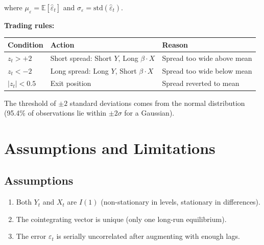 \documentclass[12pt, a4paper]{article}
\begin{document}
where $\mu_\varepsilon = \mathbb{E}[\hat\varepsilon_t]$ and $\sigma_\varepsilon = \text{std}(\hat\varepsilon_t)$.

\textbf{Trading rules:}
\begin{center}
\begin{tabular}{@{}lll@{}}
\toprule
\textbf{Condition} & \textbf{Action} & \textbf{Reason} \\
\midrule
$z_t > +2$      & Short spread: Short $Y$, Long $\beta \cdot X$  & Spread too wide above mean \\
$z_t < -2$      & Long spread:  Long $Y$, Short $\beta \cdot X$  & Spread too wide below mean \\
$|z_t| < 0.5$   & Exit position                                    & Spread reverted to mean \\
\bottomrule
\end{tabular}
\end{center}

The threshold of $\pm 2$ standard deviations comes from the normal distribution 
(95.4\% of observations lie within $\pm 2\sigma$ for a Gaussian).

\section{Assumptions and Limitations}

\subsection{Assumptions}
\begin{enumerate}
    \item Both $Y_t$ and $X_t$ are $I(1)$ (non-stationary in levels, stationary in differences).
    \item The cointegrating vector is unique (only one long-run equilibrium).
    \item The error $\varepsilon_t$ is serially uncorrelated after augmenting with enough lags.
\end{enumerate}
\end{document}
